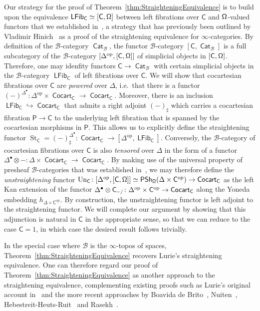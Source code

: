 \documentclass[reqno]{amsart}
\numberwithin{equation}{subsection}
\theoremstyle{plain}
\theoremstyle{definition}
\let\scr=\mathcal
\let\into=\hookrightarrow
\def\BB{\scr B}
\DeclareMathOperator{\IPSh}{\mathsf{PSh}}
\DeclareMathOperator{\ICat}{\mathsf{Cat}}
\DeclareMathOperator{\ICocart}{\mathsf{Cocart}}
\DeclareMathOperator{\ILFib}{\mathsf{LFib}}
\DeclareMathOperator{\St}{St}
\DeclareMathOperator{\Un}{Un}
\newcommand{\op}{\mathrm{op}}
\newcommand{\Under}[2]{#1_{\hspace{-1pt}#2/}}
\newcommand{\I}[1]{\mathsf{#1}}
\newcommand{\iFun}[2]{{[#1,#2]}}
\begin{document}
Our strategy for the proof of Theorem~\ref{thm:StraighteningEquivalence} is to build upon the equivalence $\ILFib_{\I{C}}\simeq\iFun{\I{C}}{\Univ}$ between left fibrations over $\I{C}$ and $\Univ$-valued functors that we established in~\cite{Martini2021}, a strategy that has previously been outlined by Vladimir Hinich~\cite{Hinich2017} as a proof of the straightening equivalence for $\infty$-categories. By definition of the $\BB$-category $\ICat_{\BB}$, the functor $\BB$-category $\iFun{\I{C}}{\ICat_{\BB}}$ is a full subcategory of the $\BB$-category $\iFun{\Delta^{\op}}{\iFun{\I{C}}{\Univ}}$ of simplicial objects in $\iFun{\I{C}}{\Univ}$. Therefore, one may idenfity functors $\I{C}\to\ICat_{\BB}$ with certain simplicial objects in the $\BB$-category $\ILFib_{\I{C}}$ of left fibrations over $\I{C}$. We will show that cocartesian fibrations over $\I{C}$ are \emph{powered} over $\Delta$, i.e.\ that there is a functor $(-)^{\Delta^{\bullet}}\colon \Delta^{\op}\times\ICocart_{\I{C}}\to\ICocart_{\I{C}}$. Moreover, there is an inclusion $\ILFib_{\I{C}}\into\ICocart_{\I{C}}$ that admits a right adjoint $(-)_\sharp$ which carries a cocartesian fibration $\I{P}\to\I{C}$ to the underlying left fibration that is spanned by the cocartesian morphisms in $\I{P}$. This allows us to explicitly define the straightening functor $\St_{\I{C}}=(-)^{\Delta^{\bullet}}_\sharp\colon \ICocart_{\I{C}}\to\iFun{\Delta^{\op}}{\ILFib_{\I{C}}}$. Conversely, the $\BB$-category of cocartesian fibrations over $\I{C}$ is also \emph{tensored} over $\Delta$ in the form of a functor $\Delta^{\bullet}\otimes -\colon \Delta\times\ICocart_{\I{C}}\to\ICocart_{\I{C}}$. By making use of the universal property of presheaf $\BB$-categories that was established in~\cite{Martini2021a}, we may therefore define the \emph{unstraightening} functor $\Un_{\I{C}}\colon \iFun{\Delta^{\op}}{\iFun{\I{C}}{\Univ}}\simeq\IPSh_{\Univ}(\Delta\times\I{C}^{\op})\to\ICocart_{\I{C}}$ as the left Kan extension of the functor $\Delta^{\bullet}\otimes\Under{\I{C}}{-}\colon\Delta^{\op}\times\I{C}^{\op}\to\ICocart_{\I{C}}$ along the Yoneda embedding $h_{\Delta\times\I{C}^{\op}}$. By construction, the unstraightening functor is left adjoint to the straightening functor. We will complete our argument by showing that this adjunction is natural in $\I{C}$ in the appropriate sense, so that we can reduce to the case $\I{C}=1$, in which case the desired result follows trivially.

In the special case where $\BB$ is the $\infty$-topos of spaces, Theorem~\ref{thm:StraighteningEquivalence} recovers Lurie's straightening equivalence. One can therefore regard our proof of Theorem~\ref{thm:StraighteningEquivalence} as another approach to the straightening equivalence, complementing existing proofs such as Lurie's original account in~\cite{htt} and the more recent approaches by Boavida de Brito~\cite{BoavidadeBrito2018}, Nuiten~\cite{Nuiten2021}, Hebestreit-Heuts-Ruit~\cite{Hebestreit2021} and Rasekh~\cite{Rasekh2021b}.
\end{document}
